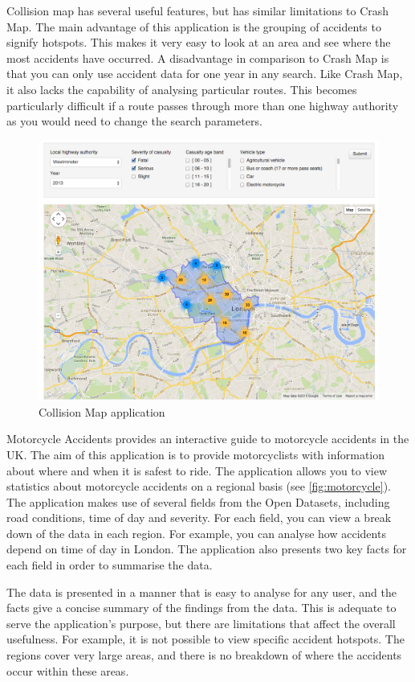 \documentclass[authoryearcitations]{UoYCSproject}
\begin{document}
Collision map has several useful features, but has similar limitations to Crash Map. The main advantage of this application is the grouping of accidents to signify hotspots. This makes it very easy to look at an area and see where the most accidents have occurred. A disadvantage in comparison to Crash Map is that you can only use accident data for one year in any search. Like Crash Map, it also lacks the capability of analysing particular routes. This becomes particularly difficult if a route passes through more than one highway authority as you would need to change the search parameters. 

\begin{figure}
	\includegraphics[scale=0.3]{collisionmap}
	\caption{Collision Map application}
	\label{fig:collisionmap}
\end{figure}

Motorcycle Accidents \citep{Mceinsurance} provides an interactive guide to motorcycle accidents in the UK. The aim of this application is to provide motorcyclists with information about where and when it is safest to ride. The application allows you to view statistics about motorcycle accidents on a regional basis (see \autoref{fig:motorcycle}). The application makes use of several fields from the Open Datasets, including road conditions, time of day and severity. For each field, you can view a break down of the data in each region. For example, you can analyse how accidents depend on time of day in London. The application also presents two key facts for each field in order to summarise the data.

The data is presented in a manner that is easy to analyse for any user, and the facts give a concise summary of the findings from the data. This is adequate to serve the application's purpose, but there are limitations that affect the overall usefulness. For example, it is not possible to view specific accident hotspots. The regions cover very large areas, and there is no breakdown of where the accidents occur within these areas.
\end{document}
